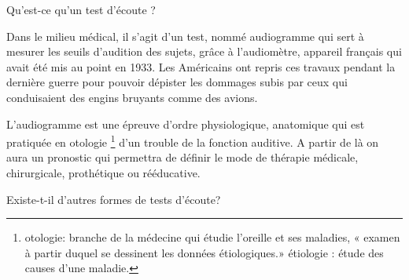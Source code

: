 Qu'est-ce qu'un test d'écoute ?

Dans le milieu médical, il s'agit d'un test, nommé audiogramme qui
sert à mesurer les seuils d'audition des sujets, grâce à l'audiomètre,
appareil français qui avait été mis au point en 1933. Les Américains
ont repris ces travaux pendant la dernière guerre pour pouvoir dépister
les dommages subis par ceux qui conduisaient des engins bruyants comme
des avions.

L'audiogramme est une épreuve d'ordre physiologique, anatomique 
qui est pratiquée en otologie \footnote{otologie: branche de la médecine qui étudie l'oreille et ses maladies,  
	« examen  à partir duquel se dessinent les données étiologiques.» 
	étiologie :
 		 étude des causes d'une maladie.}
d'un trouble de la fonction auditive. A partir de là on aura un pronostic qui permettra de définir le mode de thérapie médicale, chirurgicale, prothétique ou rééducative.


Existe-t-il d'autres formes de tests d'écoute?


